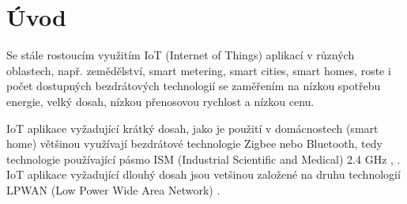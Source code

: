 \chapter{Úvod}
Se stále rostoucím využitím IoT (Internet of Things) aplikací v různých oblastech, např. zemědělství, smart metering, smart cities, smart homes, roste i počet dostupných bezdrátových technologií se zaměřením na 
nízkou spotřebu energie, velký dosah, nízkou přenosovou rychlost a nízkou cenu.

IoT aplikace vyžadující krátký dosah, jako je použití v domácnostech (smart home) většinou využívají bezdrátové technologie Zigbee nebo Bluetooth, tedy technologie používající pásmo ISM (Industrial Scientific and Medical) 2.4 GHz \cite{Design and Implementation of an IoT Assisted Real Time ZigBee Mesh WSN}, \cite{Internet of Things (IoT) for building Smart Home System}.
IoT aplikace vyžadující dlouhý dosah jsou vetšinou založené na druhu technologií LPWAN (Low Power Wide Area Network) \cite{A comparative study of LPWAN technologies for large-scale IoTdeployment}. \DIFdelbegin %

